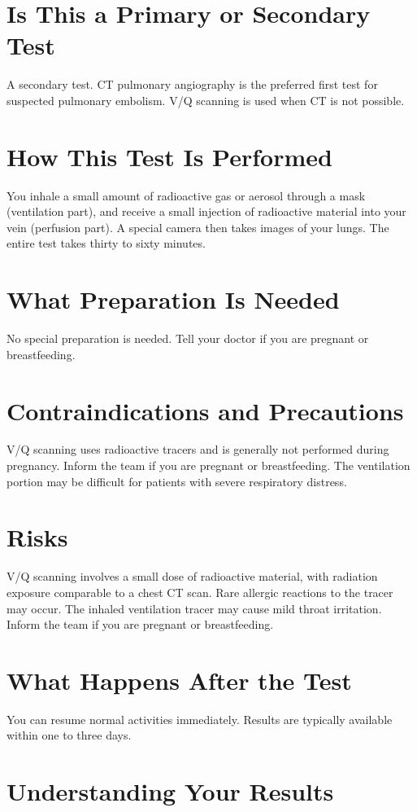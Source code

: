 \section*{Is This a Primary or Secondary Test}
A secondary test. CT pulmonary angiography is the preferred first test for suspected pulmonary embolism. V/Q scanning is used when CT is not possible.

\section*{How This Test Is Performed}
You inhale a small amount of radioactive gas or aerosol through a mask (ventilation part), and receive a small injection of radioactive material into your vein (perfusion part). A special camera then takes images of your lungs. The entire test takes thirty to sixty minutes.

\section*{What Preparation Is Needed}
No special preparation is needed. Tell your doctor if you are pregnant or breastfeeding.

\section*{Contraindications and Precautions}
V/Q scanning uses radioactive tracers and is generally not performed during pregnancy. Inform the team if you are pregnant or breastfeeding. The ventilation portion may be difficult for patients with severe respiratory distress.

\section*{Risks}
V/Q scanning involves a small dose of radioactive material, with radiation exposure comparable to a chest CT scan. Rare allergic reactions to the tracer may occur. The inhaled ventilation tracer may cause mild throat irritation. Inform the team if you are pregnant or breastfeeding.

\section*{What Happens After the Test}
You can resume normal activities immediately. Results are typically available within one to three days.

\section*{Understanding Your Results}

